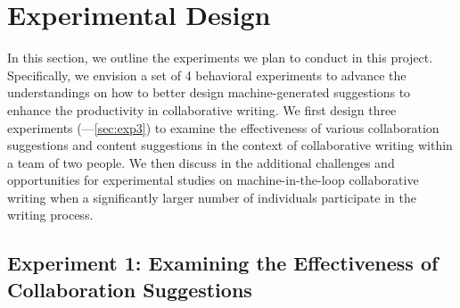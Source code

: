 
\section{Experimental Design}

In this section, we outline the experiments we plan to conduct in this project. Specifically, we envision a set of 4 behavioral experiments to advance the understandings on how to better design machine-generated suggestions to enhance the productivity in collaborative writing. We first design three experiments (---\ref{sec:exp3}) to examine the effectiveness of various collaboration suggestions and content suggestions in the context of collaborative writing within a team of two people. We then discuss in  the additional challenges and opportunities for experimental studies on machine-in-the-loop collaborative writing when a significantly larger number of individuals participate in the writing process.

\subsection{Experiment 1: Examining the Effectiveness of Collaboration Suggestions}
\label{sec:exp1}

